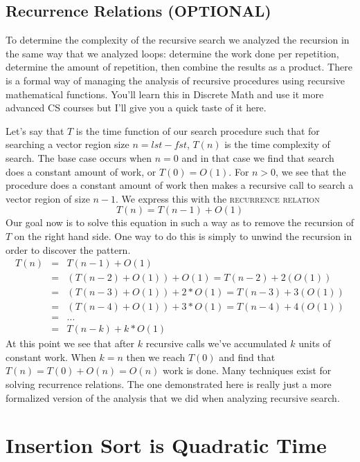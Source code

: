 \documentclass[]{tufte-handout}
\begin{document}
\subsection*{Recurrence Relations (OPTIONAL)}

To determine the complexity of the recursive search we analyzed the recursion in the same way that we analyzed loops: determine the work done per repetition, determine the amount of repetition, then combine the results as a product. There is a formal way of managing the analysis of recursive procedures using recursive mathematical functions. You'll learn this in Discrete Math and use it more advanced CS courses but I'll give you a quick taste of it here.

Let's say that $T$ is the time function of our search procedure such that for searching a vector region size $n=lst-fst$, $T(n)$ is the time complexity of search. The base case occurs when $n=0$ and in that case we find that search does a constant amount of work, or $T(0) = O(1)$. For $n>0$, we see that the procedure does a constant amount of work then makes a recursive call to search a vector region of size $n-1$. We express this with the \textsc{recurrence relation}
\[
T(n) = T(n-1) + O(1)
\]
Our goal now is to solve this equation in such a way as to remove the recursion of $T$ on the right hand side. One way to do this is simply to unwind the recursion in order to discover the pattern.
\begin{equation*}
\begin{array}{rcl}
T(n) &= & T(n-1) + O(1) \\
 &=& (T(n-2) + O(1)) + O(1) = T(n-2) + 2(O(1)) \\  
 &=& (T(n-3) + O(1)) + 2*O(1) = T(n-3) + 3(O(1)) \\
 &=& (T(n-4) + O(1)) + 3*O(1) = T(n-4) + 4(O(1)) \\
 &=& \ldots \\
 &=& T(n-k) + k*O(1)
\end{array}
\end{equation*}
At this point we see that after $k$ recursive calls we've accumulated $k$ units of constant work. When $k=n$ then we reach $T(0)$ and find that $T(n) = T(0)+O(n)=O(n)$ work is done. Many techniques exist for solving recurrence relations. The one demonstrated here is really just a more formalized version of the analysis that we did when analyzing recursive search.

\section{Insertion Sort is Quadratic Time}
\end{document}
